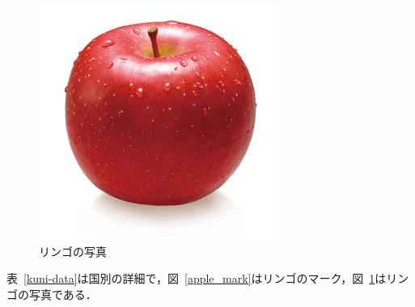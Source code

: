 \documentclass[a4j]{jarticle}
\begin{document}
\begin{figure}[htb]
    \begin{center}
        \includegraphics[scale=0.4]{apple02.jpg}
        \vspace{-5mm}
        \caption{リンゴの写真}
        \label{apple_pic}
    \end{center}
\end{figure}


表~\ref{kuni-data}は国別の詳細で，図~\ref{apple_mark}はリンゴのマーク，図~\ref{apple_pic}はリンゴの写真である．

    
\end{document}
